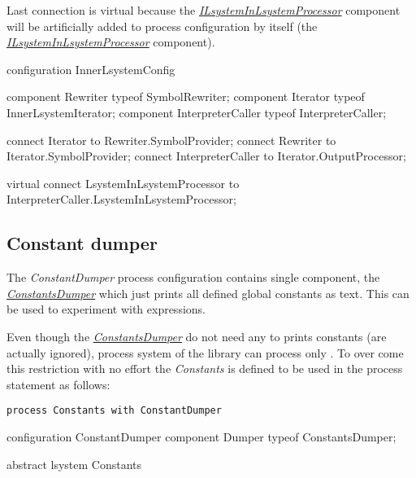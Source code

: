 Last connection is virtual because the \hyperref[Malsys.Processing.Components.Common.ILsystemInLsystemProcessor]{\emph{ILsystemInLsystemProcessor}} component will be artificially added
	to process configuration by itself (the \hyperref[Malsys.Processing.Components.Common.ILsystemInLsystemProcessor]{\emph{ILsystemInLsystemProcessor}} component).


\begin{LsystemBreak}
configuration InnerLsystemConfig {
	component Rewriter typeof SymbolRewriter;
	component Iterator typeof InnerLsystemIterator;
	component InterpreterCaller typeof InterpreterCaller;

	connect Iterator to Rewriter.SymbolProvider;
	connect Rewriter to Iterator.SymbolProvider;
	connect InterpreterCaller to Iterator.OutputProcessor;
	
	virtual connect LsystemInLsystemProcessor
		to InterpreterCaller.LsystemInLsystemProcessor;
}
\end{LsystemBreak}


\subsection{Constant dumper}

The \emph{ConstantDumper} process configuration contains single component, the \hyperref[Malsys.Processing.Components.Common.ConstantsDumper]{\emph{ConstantsDumper}} which just prints all defined global constants as text.
This can be used to experiment with expressions.

Even though the \hyperref[Malsys.Processing.Components.Common.ConstantsDumper]{\emph{ConstantsDumper}} do not need any \lsystems to prints constants (\lsystems are actually ignored), process system of the library can process only \lsystems.
To over come this restriction with no effort the \emph{Constants} \lsystem is defined to be used in the process statement as follows:

\noindent
\texttt{process Constants with ConstantDumper}

\begin{LsystemBreak}
configuration ConstantDumper {
	component Dumper typeof ConstantsDumper;
}

abstract lsystem Constants { }
\end{LsystemBreak}



